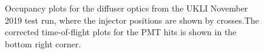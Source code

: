 \begin{figure}
    \centering
    
    \caption{Occupancy plots for the diffuser optics from the UKLI November 2019 test run, where the injector positions are shown by crosses.The corrected time-of-flight plots for the PMT hits is shown in the bottom right corner.} \label{fig:occupancy_diffuser} 
    
     \hfill
     \par
     \hfill

\end{figure}
